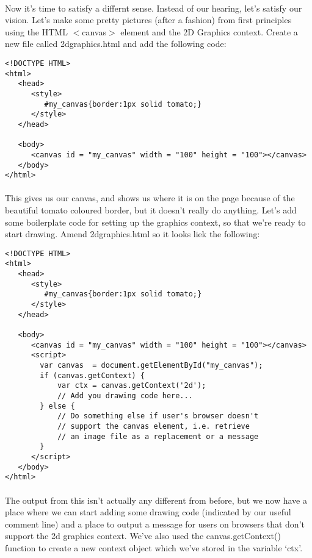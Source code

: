 \documentclass[10pt, a4paper]{article}
\begin{document}
\paragraph{} Now it's time to satisfy a differnt sense. Instead of our hearing, let's satisfy our vision. Let's make some pretty pictures (after a fashion) from first principles using the HTML $<$canvas$>$ element and the 2D Graphics context. Create a new file called 2dgraphics.html and add the following code:

\begin{lstlisting}
<!DOCTYPE HTML>
<html>
   <head>
      <style>
         #my_canvas{border:1px solid tomato;}
      </style>
   </head>
   
   <body>
      <canvas id = "my_canvas" width = "100" height = "100"></canvas>
   </body>
</html>
\end{lstlisting}

\paragraph{} This gives us our canvas, and shows us where it is on the page because of the beautiful tomato coloured border, but it doesn't really do anything. Let's add some boilerplate code for setting up the graphics context, so that we're ready to start drawing. Amend 2dgraphics.html so it looks liek the following:

\begin{lstlisting}
<!DOCTYPE HTML>
<html>
   <head>
      <style>
         #my_canvas{border:1px solid tomato;}
      </style>
   </head>
   
   <body>
      <canvas id = "my_canvas" width = "100" height = "100"></canvas>
      <script>
        var canvas  = document.getElementById("my_canvas");
        if (canvas.getContext) {   
            var ctx = canvas.getContext('2d');   
            // Add you drawing code here...
        } else {      
            // Do something else if user's browser doesn't
            // support the canvas element, i.e. retrieve
            // an image file as a replacement or a message
        } 
      </script>
   </body>
</html>
\end{lstlisting}
\paragraph{} The output from this isn't actually any different from before, but we now have a place where we can start adding some drawing code (indicated by our useful comment line) and a place to output a message for users on browsers that don't support the 2d graphics context. We've also used the canvas.getContext() function to create a new context object which we've stored in the variable `ctx'.
\end{document}
